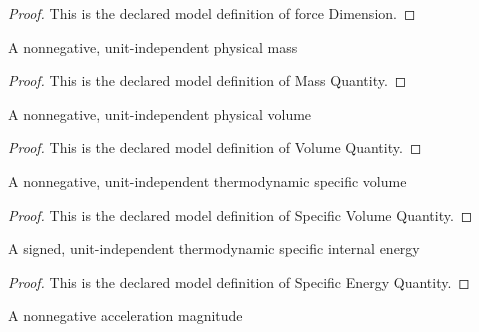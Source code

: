 \begin{proof}
  This is the declared model definition of force Dimension.
\end{proof}
\begin{definition}
  \label{def:physics:phyx-mini-0463:phyxminiproblems-problemphyxmini0463-massquantity}
  A nonnegative, unit-independent physical mass
\end{definition}
\begin{proof}
  This is the declared model definition of Mass Quantity.
\end{proof}
\begin{definition}
  \label{def:physics:phyx-mini-0463:phyxminiproblems-problemphyxmini0463-volumequantity}
  A nonnegative, unit-independent physical volume
\end{definition}
\begin{proof}
  This is the declared model definition of Volume Quantity.
\end{proof}
\begin{definition}
  \label{def:physics:phyx-mini-0463:phyxminiproblems-problemphyxmini0463-specificvolumequantity}
  A nonnegative, unit-independent thermodynamic specific volume
\end{definition}
\begin{proof}
  This is the declared model definition of Specific Volume Quantity.
\end{proof}
\begin{definition}
  \label{def:physics:phyx-mini-0463:phyxminiproblems-problemphyxmini0463-specificenergyquantity}
  A signed, unit-independent thermodynamic specific internal energy
\end{definition}
\begin{proof}
  This is the declared model definition of Specific Energy Quantity.
\end{proof}
\begin{definition}
  \label{def:physics:phyx-mini-0463:phyxminiproblems-problemphyxmini0463-accelerationquantity}
  A nonnegative acceleration magnitude
\end{definition}
